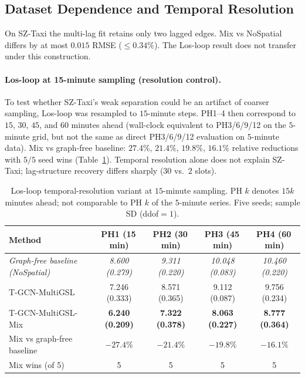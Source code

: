 \subsection{Dataset Dependence and Temporal Resolution}\label{sec:res-boundaries}

On SZ-Taxi the multi-lag fit retains only two lagged edges. Mix vs
NoSpatial differs by at most $0.015$ RMSE ($\le 0.34\%$). The Los-loop
result does not transfer under this construction.

\paragraph{Los-loop at 15-minute sampling (resolution control).}
To test whether SZ-Taxi's weak separation could be an artifact of coarser
sampling, Los-loop was resampled to $15$-minute steps. PH1--4 then
correspond to $15$, $30$, $45$, and $60$ minutes ahead (wall-clock
equivalent to PH3/6/9/12 on the $5$-minute grid, but not the same as
direct PH3/6/9/12 evaluation on $5$-minute data). Mix vs graph-free baseline:
$27.4\%$, $21.4\%$, $19.8\%$, $16.1\%$ relative reductions with $5/5$ seed
wins (Table~\ref{tab:los15}). Temporal resolution alone does not explain
SZ-Taxi; lag-structure recovery differs sharply ($30$ vs.\ $2$ slots).

\begin{table}[t]
\centering
\caption{Los-loop temporal-resolution variant at $15$-minute sampling.
PH $k$ denotes $15k$ minutes ahead; not comparable to PH $k$ of the
$5$-minute series. Five seeds; sample SD (ddof$=1$).}
\label{tab:los15}
\small
\begin{tabular}{lcccc}
\toprule
Method & PH1 (15\,min) & PH2 (30\,min) & PH3 (45\,min) & PH4 (60\,min) \\
\midrule
\textit{Graph-free baseline (NoSpatial)} & \textit{8.600 (0.279)} & \textit{9.311 (0.220)} & \textit{10.048 (0.083)} & \textit{10.460 (0.220)} \\
\midrule
T-GCN-MultiGSL & 7.246 (0.333) & 8.571 (0.365) & 9.112 (0.087) & 9.756 (0.234) \\
T-GCN-MultiGSL-Mix & \textbf{6.240 (0.209)} & \textbf{7.322 (0.378)} & \textbf{8.063 (0.227)} & \textbf{8.777 (0.364)} \\
\midrule
Mix vs graph-free baseline & $-27.4\%$ & $-21.4\%$ & $-19.8\%$ & $-16.1\%$ \\
Mix wins (of 5) & 5 & 5 & 5 & 5 \\
\bottomrule
\end{tabular}
\end{table}

